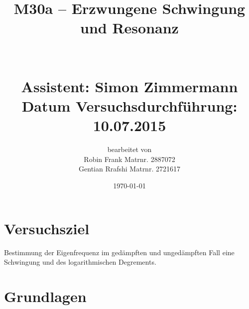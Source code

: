 \documentclass[fontsize=12pt]{scrartcl}
\begin{document}
\begin{minipage}{0.9\textwidth}
\begin{center}\large
\title{ M30a – Erzwungene Schwingung und Resonanz \\
		~\\
		~\\
		Assistent: Simon Zimmermann \\
		Datum Versuchsdurchführung: \\
		10.07.2015}

\author{bearbeitet von\\
		Robin Frank Matrnr. 2887072 \\
		Gentian Rrafshi Matrnr. 2721617 }
\date{\today}

\maketitle

\end{center}
\end{minipage}

\newpage

\tableofcontents

\newpage
\noindent

\section{ Versuchsziel}

Bestimmung der Eigenfrequenz im gedämpften und ungedämpften Fall eine Schwingung und des logarithmischen Degrements.

\section{ Grundlagen}
\end{document}
